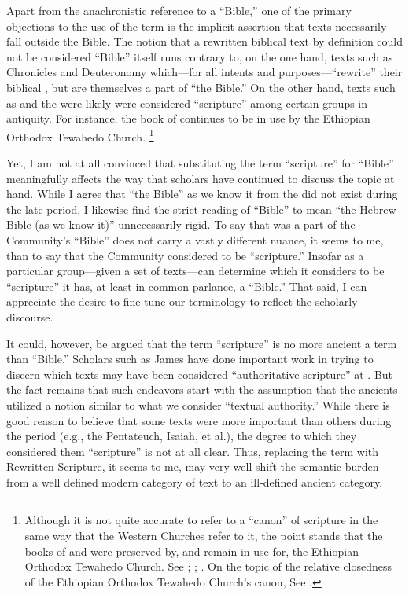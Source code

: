 Apart from the anachronistic reference to a ``Bible,'' one of the primary objections to the use of the term \rwb is the implicit assertion that \rwb texts necessarily fall outside the Bible.%
    \autocite[61]{campbell_zsengeller2014}
The notion that a rewritten biblical text by definition could not be considered ``Bible'' itself runs contrary to, on the one hand, texts such as Chronicles and Deuteronomy which---for all intents and purposes---``rewrite'' their biblical \vorlagen, but are themselves a part of ``the Bible.'' On the other hand, texts such as \jub and the \templescroll were likely were considered ``scripture'' among certain groups in antiquity. For instance, the book of \jub continues to be in use by the Ethiopian Orthodox Tewahedo Church.%
    \footnote{%
        Although it is not quite accurate to refer to a ``canon'' of scripture in the same way that the Western Churches refer to it, the point stands that the books of \enoch and \jub were preserved by, and remain in use for, the Ethiopian Orthodox Tewahedo Church. See 
        \cite{baynes_mason-etal2012}; 
        \cite{asale_js2013}; 
        \cite{cowley_os1974}. On the topic of the relative closedness of the Ethiopian Orthodox Tewahedo Church's canon, See 
        \cite{asale_bt2016}.}

Yet, I am not at all convinced that substituting the term ``scripture'' for ``Bible'' meaningfully affects the way that scholars have continued to discuss the topic at hand. While I agree that ``the Bible'' as we know it from the  did not exist during the late \secondtemple period, I likewise find the strict reading of ``Bible'' to mean ``the Hebrew Bible (as we know it)'' unnecessarily rigid. To say that \jub was a part of the \qumran Community's ``Bible'' does not carry a vastly different nuance, it seems to me, than to say that the \qumran Community considered \jub to be ``scripture.'' Insofar as a particular group---given a set of texts---can determine which it considers to be ``scripture'' it has, at least in common parlance, a ``Bible.'' That said, I can appreciate the desire to fine-tune our terminology to reflect the scholarly discourse. 

It could, however, be argued that the term ``scripture'' is no more ancient a term than ``Bible.'' Scholars such as James \vanderkam have done important work in trying to discern which texts may have been considered ``authoritative scripture'' at \qumran.%
    \autocite{vanderkam_dsd1998}
But the fact remains that such endeavors start with the assumption that the ancients utilized a notion similar to what we consider ``textual authority.''%
    \autocite{brooke_rev-qumran2012}
While there is good reason to believe that some texts were more important than others during the \secondtemple period (e.g., the Pentateuch, Isaiah, et al.), the degree to which they considered them ``scripture'' is not at all clear. Thus, replacing the term \rwb with Rewritten Scripture, it seems to me, may very well shift the semantic burden from a well defined modern category of text to an ill-defined ancient category. 

